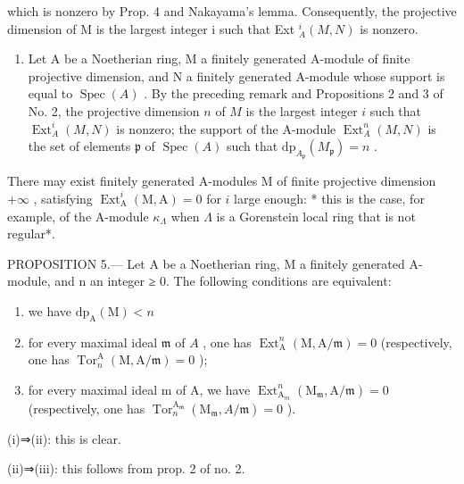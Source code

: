 which is nonzero by Prop. 4 and Nakayama’s lemma. Consequently, the projective dimension of M is the largest integer i such that Ext \(_{A}^{i}(M,N)\) is nonzero.

\begin{enumerate}
\def\labelenumi{\arabic{enumi})}
\setcounter{enumi}{2}
\tightlist
\item
  Let A be a Noetherian ring, M a finitely generated A-module of finite projective dimension, and N a finitely generated A-module whose support is equal to \(\operatorname{Spec}(A)\) . By the preceding remark and Propositions 2 and 3 of No. 2, the projective dimension \(n\) of \(M\) is the largest integer \(i\) such that \(\operatorname{Ext}_{A}^{i}(M,N)\) is nonzero; the support of the A-module \(\operatorname{Ext}_{A}^{n}(M,N)\) is the set of elements \(\mathfrak{p}\) of \(\operatorname{Spec}(A)\) such that \(\mathrm{dp}_{A_{\mathfrak{p}}}(M_{\mathfrak{p}})=n\) .
\end{enumerate}

There may exist finitely generated A-modules M of finite projective dimension \(+\infty\) , satisfying \(\operatorname{Ext}_{\mathrm{A}}^{i}(\mathrm{M},\mathrm{A})=0\) for \(i\) large enough: * this is the case, for example, of the A-module \(\kappa_{\Lambda}\) when \(\Lambda\) is a Gorenstein local ring that is not regular*.

PROPOSITION 5.--- Let A be a Noetherian ring, M a finitely generated A-module, and n an integer ≥ 0. The following conditions are equivalent:

\begin{enumerate}
\def\labelenumi{(\roman{enumi})}
\item
  we have \(\mathrm{dp}_{\mathrm{A}}(\mathrm{M}) < n\)
\item
  for every maximal ideal \(\mathfrak{m}\) of \(A\) , one has \(\operatorname{Ext}_{\mathrm{A}}^{n}(\mathrm{M},\mathrm{A}/\mathfrak{m}) = 0\) (respectively, one has \(\operatorname{Tor}_{n}^{\mathrm{A}}(\mathrm{M},\mathrm{A}/\mathfrak{m}) = 0\) );
\item
  for every maximal ideal m of A, we have \(\operatorname{Ext}_{\mathrm{A}_{m}}^{n}(\mathrm{M}_{\mathfrak{m}},\mathrm{A}/\mathfrak{m})=0\) (respectively, one has \(\operatorname{Tor}_{n}^{\mathrm{A}_{\mathfrak{m}}}(\mathrm{M}_{\mathfrak{m}},A/\mathfrak{m})=0\) ).
\end{enumerate}

(i)⇒(ii): this is clear.

(ii)⇒(iii): this follows from prop. 2 of no. 2.


